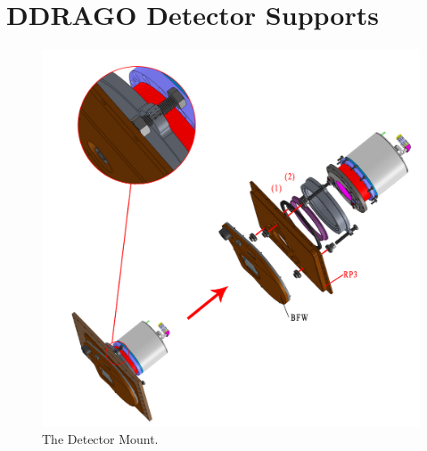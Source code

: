 \documentclass{article}
\newcommand{\micron}{\mbox{$\mu$m}}
\newcommand{\TODO}[1]{\textcolor{red}{TODO: #1}}
\begin{document}
%
%
%

\clearpage
\section{DDRAGO Detector Supports}

\begin{figure}[p]
\begin{center}
\includegraphics[width=\linewidth]{newfigures/Fig5_1.png}
\end{center}
\caption{The Detector Mount.}
\label{figure:alex-detector-mount}
\end{figure}
\end{document}
